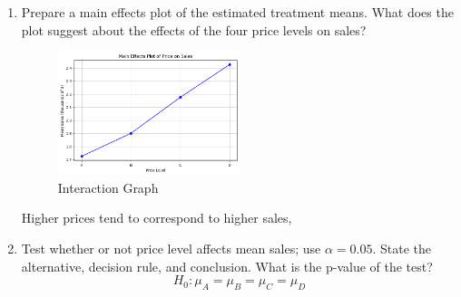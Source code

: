\documentclass{article}
\begin{document}
\begin{enumerate}
	\item Prepare a main effects plot of the estimated treatment means. What does the plot suggest about the effects of the
	      four price levels on sales?
	      \begin{figure}[H]
		      \centering
		      \includegraphics[width=0.5\textwidth]{assets/price_plot.png}
		      \caption{Interaction Graph}
	      \end{figure}
	      Higher prices tend to correspond to higher sales,
	      \pagebreak
	\item Test whether or not price level affects mean sales; use $\alpha = 0.05$. State the alternative,
	      decision rule, and conclusion. What is the p-value of the test?
	      \[
		      H_0: \mu_A = \mu_B = \mu_C = \mu_D
	      \]


\end{enumerate}
\end{document}
